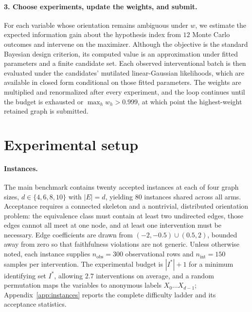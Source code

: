 \documentclass{article}
\begin{document}
\paragraph{3. Choose experiments, update the weights, and submit.}
For each variable whose orientation remains ambiguous under $w$, we estimate the expected
information gain about the hypothesis index from $12$ Monte Carlo outcomes and intervene on the
maximizer. Although the objective is the standard Bayesian design criterion, its computed value is
an approximation under fitted parameters and a finite candidate set. Each observed interventional
batch is then evaluated under the candidates' mutilated linear-Gaussian likelihoods, which are
available in closed form conditional on those fitted parameters. The weights are multiplied and
renormalized after every experiment, and the loop continues until the budget is exhausted or
$\max_h w_h > 0.999$, at which point the highest-weight retained graph is submitted.

\section{Experimental setup}
\label{sec:setup}

\paragraph{Instances.}
The main benchmark contains twenty accepted instances at each of four graph sizes,
$d \in \{4,6,8,10\}$ with $|E|=d$, yielding $80$ instances shared across all arms. Acceptance
requires a connected skeleton and a nontrivial, distributed orientation problem: the equivalence
class must contain at least two undirected edges, those edges cannot all meet at one node, and at
least one intervention must be necessary. Edge coefficients are drawn from
$(-2,-0.5)\cup(0.5,2)$, bounded away from zero so that faithfulness violations are not generic.
Unless otherwise noted,
each instance supplies $n_{\mathrm{obs}}=300$ observational
rows and $n_{\mathrm{int}}=150$ samples per intervention. The experimental budget is
$|I^*|+1$ for a minimum identifying set $I^*$, allowing $2.7$ interventions on average, and a random
permutation maps the variables to anonymous labels $X_0 \dots X_{d-1}$; Appendix~\ref{app:instances}
reports the complete difficulty ladder and its acceptance statistics.
\end{document}
